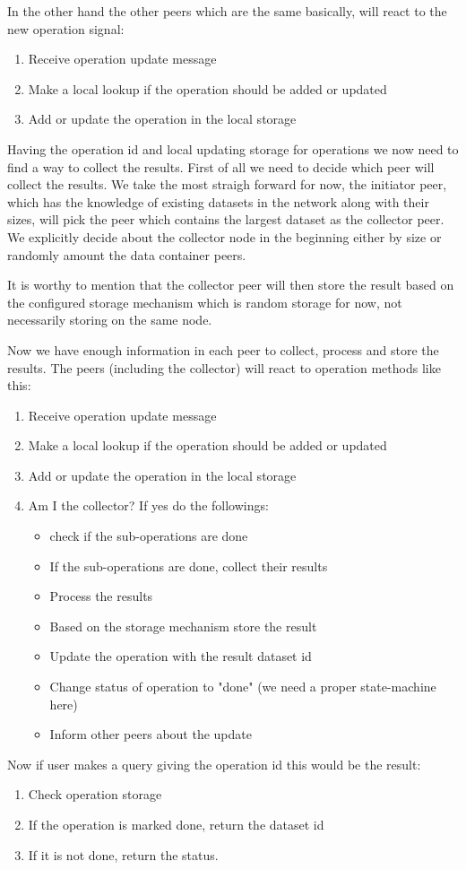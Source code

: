In the other hand the other peers which are the same basically, will react to the new operation signal:

\begin{enumerate}
\item Receive operation update message
\item Make a local lookup if the operation should be added or updated
\item Add or update the operation in the local storage
\end{enumerate}

Having the operation id and local updating storage for operations we now need to find a way to collect the results.
First of all we need to decide which peer will collect the results. We take the most straigh forward for now, the 
initiator peer, which has the knowledge of existing datasets in the network along with their sizes, will pick the 
peer which contains the largest dataset as the collector peer. We explicitly decide about the collector node in the
beginning either by size or randomly amount the data container peers.

It is worthy to mention that the collector peer will then store the result based on the configured storage mechanism 
which is random storage for now, not necessarily storing on the same node.

Now we have enough information in each peer to collect, process and store the results. The peers (including the collector)
 will react to operation methods like this:

\begin{enumerate}
\item Receive operation update message
\item Make a local lookup if the operation should be added or updated
\item Add or update the operation in the local storage
\item Am I the collector? If yes do the followings:
\begin{itemize}
\item check if the sub-operations are done
\item If the sub-operations are done, collect their results
\item Process the results
\item Based on the storage mechanism store the result
\item Update the operation with the result dataset id
\item Change status of operation to "done" (we need a proper state-machine here)
\item Inform other peers about the update
\end{itemize}
\end{enumerate}

Now if user makes a query giving the operation id this would be the result:

\begin{enumerate}
\item Check operation storage
\item If the operation is marked done, return the dataset id
\item If it is not done, return the status.
\end{enumerate}
